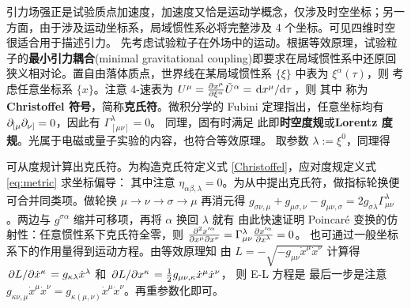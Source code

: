 引力场强正是试验质点加速度，加速度又恰是运动学概念，仅涉及时空坐标；另一方面，由于涉及运动坐标系，局域惯性系必将完整涉及 4 个坐标。可见四维时空很适合用于描述引力。
先考虑试验粒子在外场中的运动。根据等效原理，试验粒子的\textbf{最小引力耦合}(minimal gravitational coupling)即要求在局域惯性系中还原回狭义相对论。置自由落体质点，世界线在某局域惯性系 $\{\xi\}$ 中表为 $\xi^\alpha(\tau)$，则
考虑任意坐标系 $\{x\}$。注意 4-速表为 $U^\mu=\pdv{x^\mu}{\xi^\alpha}\tilde U^\alpha=\dv*{x^\mu}{\tau}$，则
其中
称为\textbf{Christoffel 符号}，简称\textbf{克氏符}。微积分学的 Fubini 定理指出，任意坐标均有 $\partial_{[\mu}\partial_{\nu]}=0$，因此有 $\Gamma^\lambda_{[\mu\nu]}=0$。
同理，固有时满足
此即\textbf{时空度规}或\textbf{Lorentz 度规}。光属于电磁或量子实验的内容，也符合等效原理。
取参数 $\lambda:=\xi^0$，同理得

可从度规计算出克氏符。为构造克氏符定义式 \eqref{Christoffel}，应对度规定义式 \eqref{eq:metric} 求坐标偏导：
其中注意 $\eta_{\alpha\beta,\lambda}=0$。为从中提出克氏符，做指标轮换便可合并同类项。做轮换 $\mu\to\nu\to\sigma\to\mu$ 再消元得 $g_{\sigma\nu,\mu}+ g_{\mu\sigma,\nu}-  g_{\mu\nu,\sigma}=2g_{\sigma\lambda}\Gamma^\lambda_{\mu\nu}$。两边与 $g^{\sigma\alpha}$ 缩并可移项，再将 $\alpha$ 换回 $\lambda$ 就有
由此快速证明 Poincaré 变换的仿射性：任意惯性系下克氏符全零，则 $\pdv{x'^\alpha}{x^\mu}{x^\nu}=\Gamma^\lambda_{\mu\nu}\pdv{x'^\alpha}{x^\lambda}=0$。
也可通过一般坐标系下的作用量得到运动方程。由等效原理知
由 $L=-\sqrt{-g_{\mu\nu}\dot x^\mu\dot x^\nu}$ 计算得 $\pdv*{L}{\dot x^\kappa}=g_{\kappa\lambda}\dot x^\lambda$ 和 $\pdv*{L}{x^\kappa}=\frac{1}{2}g_{\mu\nu,\kappa}\dot x^\mu\dot x^\nu$，
则 E-L 方程是
最后一步是注意 $g_{\kappa\nu,\mu}\dot x^\mu\dot x^\nu=g_{\kappa(\mu,\nu)}\dot x^\mu\dot x^\nu$。再重参数化即可。

